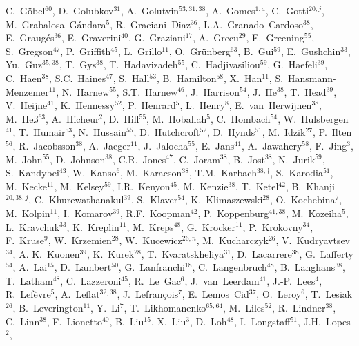 \documentclass[12pt,a4paper]{article}
\begin{document}
\begin{flushleft}
C.~G\"{o}bel$^{60}$, 
D.~Golubkov$^{31}$, 
A.~Golutvin$^{53,31,38}$, 
A.~Gomes$^{1,a}$, 
C.~Gotti$^{20,j}$, 
M.~Grabalosa~G\'{a}ndara$^{5}$, 
R.~Graciani~Diaz$^{36}$, 
L.A.~Granado~Cardoso$^{38}$, 
E.~Graug\'{e}s$^{36}$, 
E.~Graverini$^{40}$, 
G.~Graziani$^{17}$, 
A.~Grecu$^{29}$, 
E.~Greening$^{55}$, 
S.~Gregson$^{47}$, 
P.~Griffith$^{45}$, 
L.~Grillo$^{11}$, 
O.~Gr\"{u}nberg$^{63}$, 
B.~Gui$^{59}$, 
E.~Gushchin$^{33}$, 
Yu.~Guz$^{35,38}$, 
T.~Gys$^{38}$, 
T.~Hadavizadeh$^{55}$, 
C.~Hadjivasiliou$^{59}$, 
G.~Haefeli$^{39}$, 
C.~Haen$^{38}$, 
S.C.~Haines$^{47}$, 
S.~Hall$^{53}$, 
B.~Hamilton$^{58}$, 
X.~Han$^{11}$, 
S.~Hansmann-Menzemer$^{11}$, 
N.~Harnew$^{55}$, 
S.T.~Harnew$^{46}$, 
J.~Harrison$^{54}$, 
J.~He$^{38}$, 
T.~Head$^{39}$, 
V.~Heijne$^{41}$, 
K.~Hennessy$^{52}$, 
P.~Henrard$^{5}$, 
L.~Henry$^{8}$, 
E.~van~Herwijnen$^{38}$, 
M.~He\ss$^{63}$, 
A.~Hicheur$^{2}$, 
D.~Hill$^{55}$, 
M.~Hoballah$^{5}$, 
C.~Hombach$^{54}$, 
W.~Hulsbergen$^{41}$, 
T.~Humair$^{53}$, 
N.~Hussain$^{55}$, 
D.~Hutchcroft$^{52}$, 
D.~Hynds$^{51}$, 
M.~Idzik$^{27}$, 
P.~Ilten$^{56}$, 
R.~Jacobsson$^{38}$, 
A.~Jaeger$^{11}$, 
J.~Jalocha$^{55}$, 
E.~Jans$^{41}$, 
A.~Jawahery$^{58}$, 
F.~Jing$^{3}$, 
M.~John$^{55}$, 
D.~Johnson$^{38}$, 
C.R.~Jones$^{47}$, 
C.~Joram$^{38}$, 
B.~Jost$^{38}$, 
N.~Jurik$^{59}$, 
S.~Kandybei$^{43}$, 
W.~Kanso$^{6}$, 
M.~Karacson$^{38}$, 
T.M.~Karbach$^{38,\dagger}$, 
S.~Karodia$^{51}$, 
M.~Kecke$^{11}$, 
M.~Kelsey$^{59}$, 
I.R.~Kenyon$^{45}$, 
M.~Kenzie$^{38}$, 
T.~Ketel$^{42}$, 
B.~Khanji$^{20,38,j}$, 
C.~Khurewathanakul$^{39}$, 
S.~Klaver$^{54}$, 
K.~Klimaszewski$^{28}$, 
O.~Kochebina$^{7}$, 
M.~Kolpin$^{11}$, 
I.~Komarov$^{39}$, 
R.F.~Koopman$^{42}$, 
P.~Koppenburg$^{41,38}$, 
M.~Kozeiha$^{5}$, 
L.~Kravchuk$^{33}$, 
K.~Kreplin$^{11}$, 
M.~Kreps$^{48}$, 
G.~Krocker$^{11}$, 
P.~Krokovny$^{34}$, 
F.~Kruse$^{9}$, 
W.~Krzemien$^{28}$, 
W.~Kucewicz$^{26,n}$, 
M.~Kucharczyk$^{26}$, 
V.~Kudryavtsev$^{34}$, 
A. K.~Kuonen$^{39}$, 
K.~Kurek$^{28}$, 
T.~Kvaratskheliya$^{31}$, 
D.~Lacarrere$^{38}$, 
G.~Lafferty$^{54}$, 
A.~Lai$^{15}$, 
D.~Lambert$^{50}$, 
G.~Lanfranchi$^{18}$, 
C.~Langenbruch$^{48}$, 
B.~Langhans$^{38}$, 
T.~Latham$^{48}$, 
C.~Lazzeroni$^{45}$, 
R.~Le~Gac$^{6}$, 
J.~van~Leerdam$^{41}$, 
J.-P.~Lees$^{4}$, 
R.~Lef\`{e}vre$^{5}$, 
A.~Leflat$^{32,38}$, 
J.~Lefran\c{c}ois$^{7}$, 
E.~Lemos~Cid$^{37}$, 
O.~Leroy$^{6}$, 
T.~Lesiak$^{26}$, 
B.~Leverington$^{11}$, 
Y.~Li$^{7}$, 
T.~Likhomanenko$^{65,64}$, 
M.~Liles$^{52}$, 
R.~Lindner$^{38}$, 
C.~Linn$^{38}$, 
F.~Lionetto$^{40}$, 
B.~Liu$^{15}$, 
X.~Liu$^{3}$, 
D.~Loh$^{48}$, 
I.~Longstaff$^{51}$, 
J.H.~Lopes$^{2}$, 

\end{flushleft}
\end{document}
